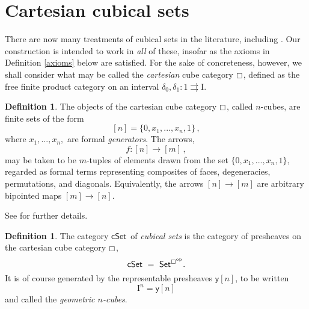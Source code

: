 \documentclass[12pt]{article}
\newcommand{\C}{\ensuremath{\boxempty}}
\newcommand{\T}{\ensuremath{\mathbb{T}}}
\newcommand{\CC}{\ensuremath{\mathcal{C}}}
\newcommand{\psh}[1]{\ensuremath{\mathsf{Set}^{#1^{\mathrm{op}}}}}
\newcommand{\cSet}{\ensuremath{\mathsf{cSet}}}
\newcommand{\y}{\ensuremath{\mathsf{y}}} %
\newcommand{\ra}{\ensuremath{\rightarrow}}
\newcommand{\I}{\ensuremath{\mathrm{I}}}
\newcommand{\U}{\ensuremath{\mathcal{U}}}
\theoremstyle{remark}
\theoremstyle{definition}
\newtheorem{definition}[theorem]{Definition}
\begin{document}
%
%
%
%
%
%
%
%
%
\section{Cartesian cubical sets}

There are now many treatments of cubical sets in the literature, including \cite{Grandis, Grandis, Jardine, Jardine, Bezem, OrtonPitts, Coquand, Cisinski}.  Our construction is intended to work in \emph{all} of these, insofar as the axioms in Definition \ref{axioms} below are satisfied.   
For the sake of concreteness, however, we shall consider what may be called the \emph{cartesian} cube category $\C$, defined as the free finite product category on an interval $\delta_0, \delta_1 : 1\rightrightarrows \I$.

\begin{definition}
The objects of the cartesian cube category $\C$, called $n$-cubes, are finite sets of the form $$[n] = \{0, x_1, ..., x_n, 1\}\,,$$  where $x_1, ..., x_n,$ are formal \emph{generators}.
The arrows,
\[
f : [n] \ra [m]\,,
\]
may be taken to be $m$-tuples of elements drawn from the set $\{0, x_1, ..., x_n, 1\},$ regarded as formal terms representing composites of faces, degeneracies, permutations, and diagonals.  Equivalently, the arrows $[n] \ra [m]$ are arbitrary bipointed maps $[m]\ra [n]$.
\end{definition}
See \cite{parker:thesis} for further details.

\begin{definition}\label{def:cSet}
The category \cSet\ of \emph{cubical sets} is the category of presheaves on the cartesian cube category $\C$,
\[
\mathsf{cSet}\ =\ \psh{\C}.
\]
It is of course generated by the representable presheaves $\y{[n]}$, to be written $$\I^n = \y{[n]}$$ and called the \emph{geometric $n$-cubes}.   
\end{definition}
\end{document}
